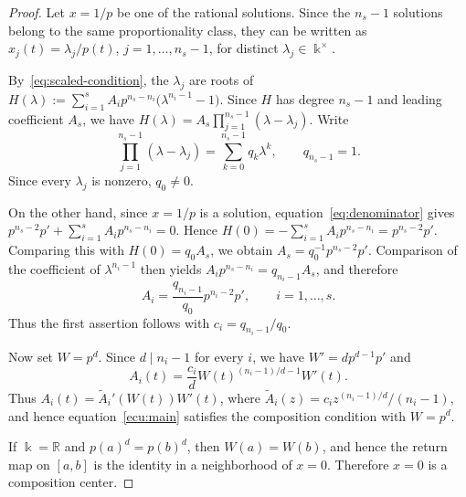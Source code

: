 \documentclass[10pt,a4paper]{amsart}
\numberwithin{theorem}{section}
\theoremstyle{definition}
\begin{document}
	\begin{proof}
		Let $x=1/p$ be one of the rational solutions. Since the $n_s-1$ solutions belong to the same proportionality class, they can be written as $x_j(t)=\lambda_j/p(t)$, $j=1,\ldots,n_s-1$, for distinct $\lambda_j\in\Bbbk^\times$.
		
		By~\eqref{eq:scaled-condition}, the $\lambda_j$ are roots of $
		H(\lambda):=\sum_{i=1}^s A_i p^{n_s-n_i}\bigl(\lambda^{n_i-1}-1\bigr)$. Since $H$ has degree $n_s-1$ and leading coefficient $A_s$, we have $H(\lambda)=A_s\prod_{j=1}^{n_s-1}(\lambda-\lambda_j)$. Write
		\[
		\prod_{j=1}^{n_s-1}(\lambda-\lambda_j)=\sum_{k=0}^{n_s-1}q_k\lambda^k,\qquad q_{n_s-1}=1.
		\]
		Since every $\lambda_j$ is nonzero, $q_0\neq0$.
		
		On the other hand, since $x=1/p$ is a solution, equation~\eqref{eq:denominator} gives $p^{n_s-2}p'+\sum_{i=1}^s A_i p^{n_s-n_i}=0$.
		Hence $H(0)=-\sum_{i=1}^s A_i p^{n_s-n_i}=p^{n_s-2}p'$. Comparing this with $H(0)=q_0A_s$, we obtain $A_s=q_0^{-1}p^{n_s-2}p'$. Comparison of the coefficient of $\lambda^{n_i-1}$ then yields $A_i p^{n_s-n_i}=q_{n_i-1}A_s$, and therefore
		\[
		A_i=\frac{q_{n_i-1}}{q_0}p^{n_i-2}p',\qquad i=1,\ldots,s.
		\]
		Thus the first assertion follows with $c_i=q_{n_i-1}/q_0$.
		
		Now set $W=p^d$. Since $d\mid n_i-1$ for every $i$, we have $W'=dp^{d-1}p'$ and
		\[
		A_i(t)=\frac{c_i}{d}W(t)^{(n_i-1)/d-1}W'(t).
		\]
		Thus $A_i(t)=\widetilde A_i'(W(t))W'(t)$, where $\widetilde A_i(z)=c_i z^{(n_i-1)/d}/(n_i-1)$, and hence equation~\eqref{ecu:main} satisfies the composition condition with $W=p^d$.
		
		If $\Bbbk=\mathbb{R}$ and $p(a)^d=p(b)^d$, then $W(a)=W(b)$, and hence the return map on $[a,b]$ is the identity in a neighborhood of $x=0$. Therefore $x=0$ is a composition center.
	\end{proof}
\end{document}
